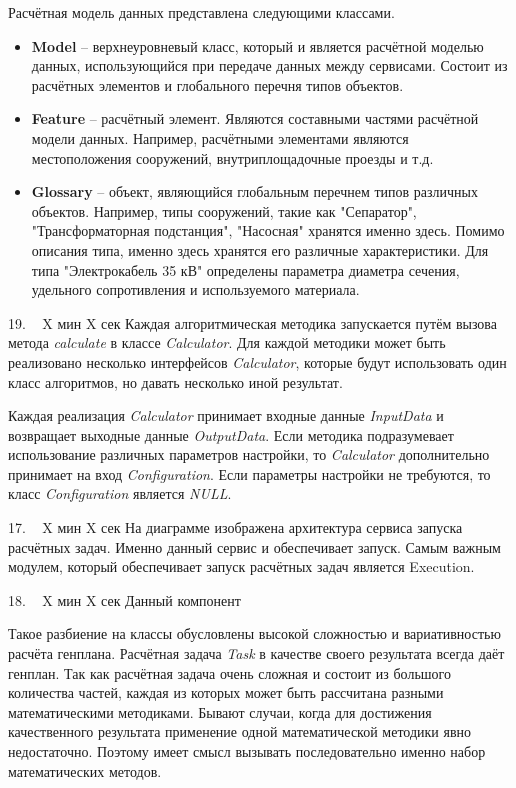 \documentclass[a4paper,14pt]{extarticle}
\begin{document}
    Расчётная модель данных представлена следующими классами.
    \begin{itemize}
        \item \textbf{Model} -- верхнеуровневый класс, который и является расчётной моделью данных, использующийся
        при передаче данных между сервисами. Состоит из расчётных элементов и глобального перечня типов объектов.
        \item {
            \textbf{Feature} -- расчётный элемент. Являются составными частями расчётной модели данных. Например, расчётными
            элементами являются местоположения сооружений, внутриплощадочные проезды и т.д.
        }
        \item {
            \textbf{Glossary} -- объект, являющийся глобальным перечнем типов различных объектов.
            Например, типы сооружений, такие как "Сепаратор", "Трансформаторная подстанция", "Насосная" хранятся именно
            здесь. Помимо описания типа, именно здесь хранятся его различные характеристики. Для типа "Электрокабель 35 кВ"
            определены параметра диаметра сечения, удельного сопротивления и используемого материала.
        }
    \end{itemize}

    19. ~ X мин X сек
    Каждая алгоритмическая методика запускается путём вызова метода \textit{calculate}
    в классе \textit{Calculator}.
    Для каждой методики может быть реализовано несколько интерфейсов \textit{Calculator},
    которые будут использовать один класс алгоритмов, но давать несколько иной результат.

    Каждая реализация \textit{Calculator} принимает входные данные \textit{InputData}
    и возвращает выходные данные \textit{OutputData}.
    Если методика подразумевает использование различных параметров настройки, то \textit{Calculator} дополнительно
    принимает на вход \textit{Configuration}. Если параметры настройки не требуются, то класс \textit{Configuration}
    является \textit{NULL}.

    17. ~ X мин X сек
    На диаграмме изображена архитектура сервиса запуска расчётных задач.
    Именно данный сервис и обеспечивает запуск.
    Самым важным модулем, который обеспечивает запуск расчётных задач является Execution.

    18. ~ X мин X сек
    Данный компонент

    Такое разбиение на классы обусловлены высокой сложностью и вариативностью расчёта генплана.
    Расчётная задача \textit{Task} в качестве своего результата всегда даёт генплан.
    Так как расчётная задача очень сложная и состоит из большого количества частей,
    каждая из которых может быть рассчитана разными математическими методиками.
    Бывают случаи, когда для достижения качественного результата применение одной математической методики
    явно недостаточно. Поэтому имеет смысл вызывать последовательно именно набор математических методов.
\end{document}
